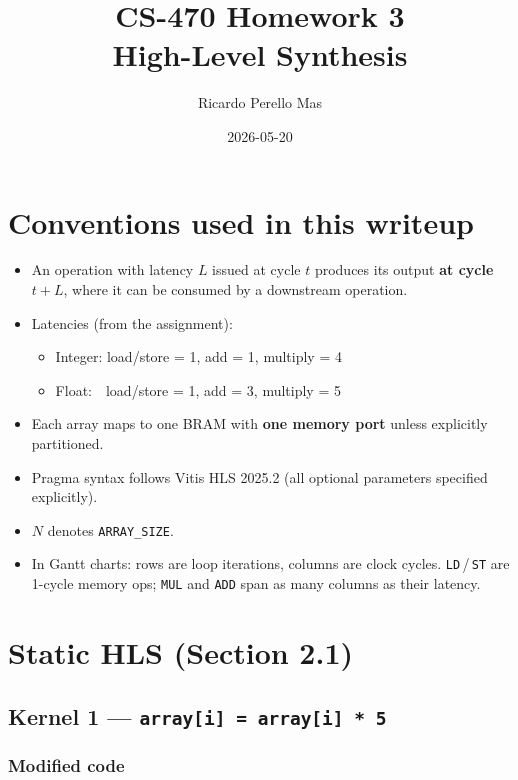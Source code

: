 \documentclass[11pt,a4paper]{article}
\title{CS-470 Homework 3 \\ \large High-Level Synthesis}
\author{Ricardo Perello Mas}
\date{2026-05-20}
\begin{document}
\maketitle

\section*{Conventions used in this writeup}

\begin{itemize}[leftmargin=*]
  \item An operation with latency $L$ issued at cycle $t$ produces its output \textbf{at cycle $t+L$}, where it can be consumed by a downstream operation.
  \item Latencies (from the assignment):
    \begin{itemize}
      \item Integer: load/store = 1, add = 1, multiply = 4
      \item Float:\ \ load/store = 1, add = 3, multiply = 5
    \end{itemize}
  \item Each array maps to one BRAM with \textbf{one memory port} unless explicitly partitioned.
  \item Pragma syntax follows Vitis HLS 2025.2 (all optional parameters specified explicitly).
  \item $N$ denotes \texttt{ARRAY\_SIZE}.
  \item In Gantt charts: rows are loop iterations, columns are clock cycles. \texttt{LD}\,/\,\texttt{ST} are 1-cycle memory ops; \texttt{MUL} and \texttt{ADD} span as many columns as their latency.
\end{itemize}

\section{Static HLS (Section 2.1)}

\subsection{Kernel 1 --- \texttt{array[i] = array[i] * 5}}

\subsubsection*{Modified code}
\end{document}
